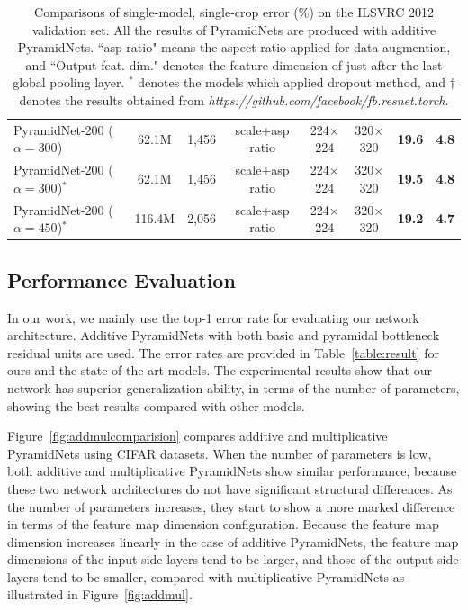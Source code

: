\documentclass[10pt,twocolumn,letterpaper]{article}
\begin{document}
\begin{table}[t]
\begin{center}
\begin{tabular}{|l|c|c|c|c|c|c|c|}
PyramidNet-200 ($\alpha=300$) & 62.1M & 1,456 & scale+asp ratio & 224$\times$224 & 320$\times$320 & {\bf19.6} & {\bf4.8}\\
PyramidNet-200 ($\alpha=300$)$^*$ & 62.1M & 1,456 & scale+asp ratio & 224$\times$224 & 320$\times$320 & {\bf19.5} & {\bf4.8}\\
PyramidNet-200 ($\alpha=450$)$^*$ & 116.4M & 2,056 & scale+asp ratio & 224$\times$224 & 320$\times$320 & {\bf19.2} & {\bf4.7}\\
\hline
\end{tabular}
\end{center}
\caption{Comparisons of single-model, single-crop error (\%) on the ILSVRC 2012 validation set. All the results of PyramidNets are produced with additive PyramidNets. ``asp ratio" means the aspect ratio applied for data augmention, and ``Output feat. dim." denotes the feature dimension of just after the last global pooling layer. $^*$ denotes the models which applied dropout method, and $\dagger$ denotes the results obtained from {\it https://github.com/facebook/fb.resnet.torch}.}
\label{table:imagenetres}
\end{table}

\subsection{Performance Evaluation}

In our work, we mainly use the top-1 error rate for evaluating our network architecture. Additive PyramidNets with both basic and pyramidal bottleneck residual units are used. The error rates are provided in Table~\ref{table:result} for ours and the state-of-the-art models. The experimental results show that our network has superior generalization ability, in terms of the number of parameters, showing the best results compared with other models. %

Figure~\ref{fig:addmulcomparision} compares additive and multiplicative PyramidNets using CIFAR datasets. When the number of parameters is low, both additive and multiplicative PyramidNets show similar performance, because these two network architectures do not have significant structural differences. As the number of parameters increases, they start to show a more marked difference in terms of the feature map dimension configuration. Because the feature map dimension increases linearly in the case of additive PyramidNets, the feature map dimensions of the input-side layers tend to be larger, and those of the output-side layers tend to be smaller, compared with multiplicative PyramidNets as illustrated in Figure~\ref{fig:addmul}.
\end{document}
